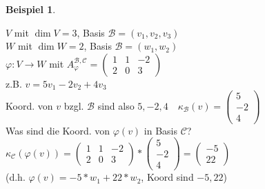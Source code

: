 \documentclass[a4paper,11pt]{article}
\newtheorem{bsp}[definition]{Beispiel}
\begin{document}
\begin{bsp}
\end{bsp}
$V$ mit $\dim V=3$, Basis $\mathcal{B}=(v_1,v_2,v_3)$ \\
$W$ mit $\dim W=2$, Basis $\mathcal{B}=(w_1,w_2)$ \\
$\varphi\colon V\to W$ mit $A^{\mathcal{B},\mathcal{C}}_\varphi=\begin{pmatrix}1&1&-2\\2&0&3\end{pmatrix}$ \\
z.B. $v=5v_1-2v_2+4v_3$ \\
Koord. von $v$ bzgl. $\mathcal{B}$ sind also $5,-2,4\quad\kappa_\mathcal{B}(v)=\begin{pmatrix}5\\-2\\4\end{pmatrix}$ \\
Was sind die Koord. von $\varphi(v)$ in Basis $\mathcal{C}$? \\
$\kappa_\mathcal{C}(\varphi(v))=\begin{pmatrix}1&1&-2\\2&0&3\end{pmatrix}*\begin{pmatrix}5\\-2\\4\end{pmatrix}=\begin{pmatrix}-5\\22\end{pmatrix}$ \\
(d.h. $\varphi(v)=-5*w_1+22*w_2$, Koord sind $-5,22$)

\newpage
\end{document}
